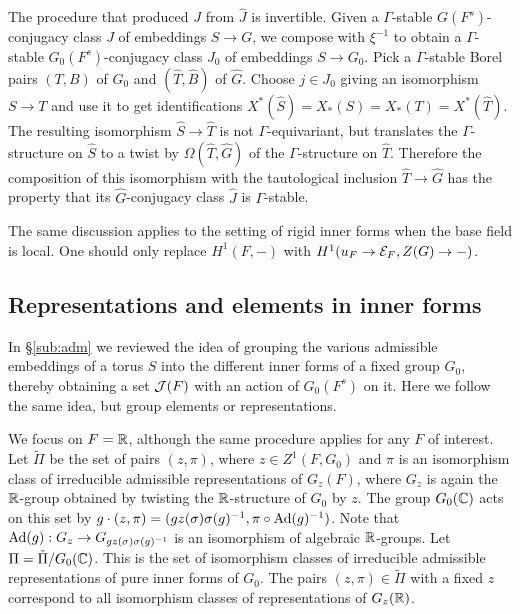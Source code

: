 \documentclass{article}
\theoremstyle{definition}
\numberwithin{equation}{section}
\renewcommand{\-}{\hyp{}}
\begin{document}
The procedure that produced $J$ from $\hat J$ is invertible. Given a $\Gamma$-stable $G(F^s)$-conjugacy class $J$ of embeddings $S \to G$, we compose with $\xi^{-1}$ to obtain a $\Gamma$-stable $G_0(F^s)$-conjugacy class $J_0$ of embeddings $S \to G_0$. Pick a $\Gamma$-stable Borel pairs $(T,B)$ of $G_0$ and $(\hat T,\hat B)$ of $\hat G$. Choose $j \in J_0$ giving an isomorphism $S \to T$ and use it to get identifications $X^*(\hat S)=X_*(S)=X_*(T)=X^*(\hat T)$. The resulting isomorphism $\hat S \to \hat T$ is not $\Gamma$-equivariant, but translates the $\Gamma$-structure on $\hat S$ to a twist by $\Omega(\hat T,\hat G)$ of the $\Gamma$-structure on $\hat T$. Therefore the composition of this isomorphism with the tautological inclusion $\hat T \to \hat G$ has the property that its $\hat G$-conjugacy class $\hat J$ is $\Gamma$-stable. 


The same discussion applies to the setting of rigid inner forms when the base field is local. One should only replace $H^1(F,-)$ with $H^1(u_F \to \mathcal{E}_F,Z(G) \to -)$.

\subsection{Representations and elements in inner forms} \label{sub:across}

In \S\ref{sub:adm} we reviewed the idea of grouping the various admissible embeddings of a torus $S$ into the different inner forms of a fixed group $G_0$, thereby obtaining a set $\mathcal{J}(F)$ with an action of $G_0(F^s)$ on it. Here we follow the same idea, but group elements or representations. 

We focus on $F=\mathbb{R}$, although the same procedure applies for any $F$ of interest. Let $\tilde\Pi$ be the set of pairs $(z,\pi)$, where $z \in Z^1(F,G_0)$ and $\pi$ is an isomorphism class of irreducible admissible representations of $G_z(F)$, where $G_z$ is again the $\mathbb{R}$-group obtained by twisting the $\mathbb{R}$-structure of $G_0$ by $z$. The group $G_0(\mathbb{C})$ acts on this set by $g\cdot (z,\pi) = (gz(\sigma)\sigma(g)^{-1},\pi \circ\textrm{Ad}(g)^{-1})$. Note that $\textrm{Ad}(g) : G_z \to G_{gz(\sigma)\sigma(g)^{-1}}$ is an isomorphism of algebraic $\mathbb{R}$-groups. Let $\Pi=\tilde\Pi/G_0(\mathbb{C})$. This is the set of isomorphism classes of irreducible admissible representations of pure inner forms of $G_0$. The pairs $(z,\pi) \in \tilde\Pi$ with a fixed $z$ correspond to all isomorphism classes of representations of $G_z(\mathbb{R})$.
\end{document}
